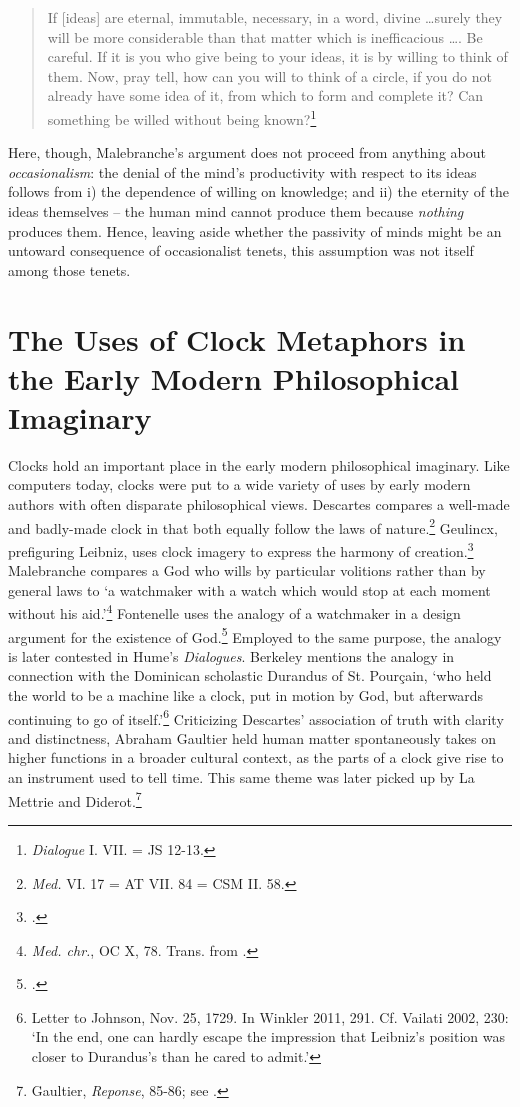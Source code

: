 \documentclass{article}
\begin{document}
\begin{quote}
If {[}ideas{]} are eternal, immutable, necessary, in a word, divine
\ldots surely they will be more considerable than that matter
which is inefficacious \ldots. Be careful. If it is you who give
being to your ideas, it is by willing to think of them. Now, pray tell,
how can you will to think of a circle, if you do not already have some
idea of it, from which to form and complete it? Can something be willed
without being known?\footnote{\emph{Dialogue} I. VII. = JS 12-13.}
\end{quote}

Here, though, Malebranche's argument does not proceed from anything
about \emph{occasionalism}: the denial of the mind's productivity with
respect to its ideas follows from i) the dependence of willing on
knowledge; and ii) the eternity of the ideas themselves -- the human
mind cannot produce them because \emph{nothing} produces them. Hence,
leaving aside whether the passivity of minds might be an untoward
consequence of occasionalist tenets, this assumption was not itself
among those tenets.

\section{The Uses of Clock Metaphors in the Early Modern Philosophical
Imaginary}

Clocks hold an important place in the early modern philosophical
imaginary. Like computers today, clocks were put to a wide variety of
uses by early modern authors with often disparate philosophical views.
Descartes compares a well-made and badly-made clock in that both equally
follow the laws of nature.\footnote{\emph{Med.} VI. 17 = AT VII. 84 =
  CSM II. 58.} Geulincx, prefiguring Leibniz, uses clock imagery to
express the harmony of creation.\footnote{\autocite[168]{Cooney1978}.} Malebranche
compares a God who wills by particular volitions rather than by general
laws to `a watchmaker with a watch which would stop at each moment
without his aid.'\footnote{\emph{Med. chr.}, OC X, 78. Trans. from \autocite[235]{Wahl2011}.} Fontenelle uses the analogy of a watchmaker in a design
argument for the existence of God.\footnote{\autocite[618]{Durant1963}.}
Employed to the same purpose, the analogy is later contested in Hume's
\emph{Dialogues}. Berkeley mentions the analogy in connection with the
Dominican scholastic Durandus of St. Pourçain, `who held the world to be
a machine like a clock, put in motion by God, but afterwards continuing
to go of itself.'\footnote{Letter to Johnson, Nov. 25, 1729. In Winkler
  2011, 291. Cf. Vailati 2002, 230: `In the end, one can hardly escape
  the impression that Leibniz's position was closer to Durandus's than
  he cared to admit.'} Criticizing Descartes' association of truth with
clarity and distinctness, Abraham Gaultier held human matter
spontaneously takes on higher functions in a broader cultural context,
as the parts of a clock give rise to an instrument used to tell time.
This same theme was later picked up by La Mettrie and Diderot.\footnote{Gaultier,
  \emph{Reponse}, 85-86; see \autocite{Kaitaro2016}.}
\end{document}
